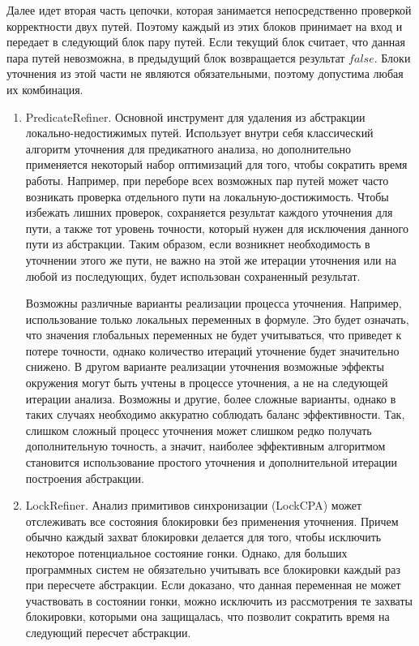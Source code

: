 Далее идет вторая часть цепочки, которая занимается непосредственно проверкой корректности двух путей.
Поэтому каждый из этих блоков принимает на вход и передает в следующий блок пару путей.
Если текущий блок считает, что данная пара путей невозможна, в предыдущий блок возвращается результат $false$.
Блоки уточнения из этой части не являются обязательными, поэтому допустима любая их комбинация.

\begin{enumerate}

\item PredicateRefiner. Основной инструмент для удаления из абстракции локально-недостижимых путей. 
Использует внутри себя классический алгоритм уточнения для предикатного анализа, но дополнительно применяется некоторый набор оптимизаций для того, чтобы сократить время работы.
Например, при переборе всех возможных пар путей может часто возникать проверка отдельного пути на локальную-достижимость. 
Чтобы избежать лишних проверок, сохраняется результат каждого уточнения для пути, а также тот уровень точности, который нужен для исключения данного пути из абстракции.
Таким образом, если возникнет необходимость в уточнении этого же пути, не важно на этой же итерации уточнения или на любой из последующих, будет использован сохраненный результат. 

Возможны различные варианты реализации процесса уточнения.
Например, использование только локальных переменных в формуле.
Это будет означать, что значения глобальных переменных не будет учитываться, что приведет к потере точности, однако количество итераций уточнение будет значительно снижено.
В другом варианте реализации уточнения возможные эффекты окружения могут быть учтены в процессе уточнения, а не на следующей итерации анализа.
Возможны и другие, более сложные варианты, однако в таких случаях необходимо аккуратно соблюдать баланс эффективности.
Так, слишком сложный процесс уточнения может слишком редко получать дополнительную точность, а значит, наиболее эффективным алгоритмом становится использование простого уточнения и дополнительной итерации построения абстракции.

\item LockRefiner. Анализ примитивов синхронизации (LockCPA) может отслеживать все состояния блокировки без применения уточнения.
Причем обычно каждый захват блокировки делается для того, чтобы исключить некоторое потенциальное состояние гонки.
Однако, для больших программных систем не обязательно учитывать все блокировки каждый раз при пересчете абстракции.
Если доказано, что данная переменная не может участвовать в состоянии гонки, можно исключить из рассмотрения те захваты блокировки, которыми она защищалась, что позволит сократить время на следующий пересчет абстракции.


\end{enumerate}
